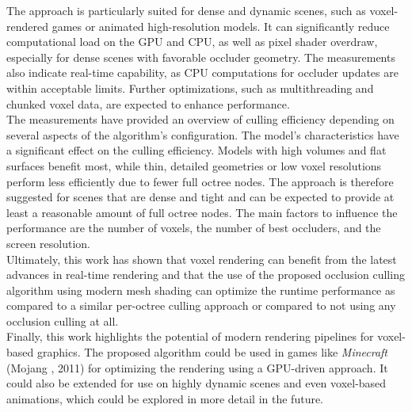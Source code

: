 \clearpage

\noindent
The approach is particularly suited for dense and dynamic scenes, such as voxel-rendered 
games or animated high-resolution models. It can significantly reduce computational load 
on the \ac{GPU} and \ac{CPU}, as well as pixel shader overdraw, especially for dense scenes with 
favorable occluder geometry. The measurements also indicate real-time capability, as 
\ac{CPU} computations for occluder updates are within acceptable limits. Further 
optimizations, such as multithreading and chunked voxel data, are expected to enhance 
performance. \\


\noindent
The measurements have provided an overview of culling efficiency depending on several 
aspects of the algorithm's configuration. The model's characteristics have a significant 
effect on the culling efficiency. Models with high volumes and flat surfaces benefit most, 
while thin, detailed geometries or low voxel resolutions perform less efficiently due 
to fewer full octree nodes. The approach is therefore suggested for scenes that are dense 
and tight and can be expected to provide at least a reasonable amount of full octree nodes. 
The main factors to influence the performance are the number of voxels, the number of 
best occluders, and the screen resolution.\\

\noindent
Ultimately, this work has shown that voxel rendering can benefit from the latest advances 
in real-time rendering and that the use of the proposed occlusion culling algorithm 
using modern mesh shading can optimize the runtime performance as compared to a similar 
per-octree culling approach or compared to not using any occlusion culling at all. \\

\noindent
Finally, this work highlights the potential of modern rendering pipelines for voxel-based 
graphics. The proposed algorithm could be used in games like \emph{Minecraft} (Mojang 
\cite{Mojang2024}, 2011) for optimizing the rendering using a \ac{GPU}-driven approach. It 
could also be extended for use on highly dynamic scenes and even voxel-based animations, 
which could be explored in more detail in the future.
